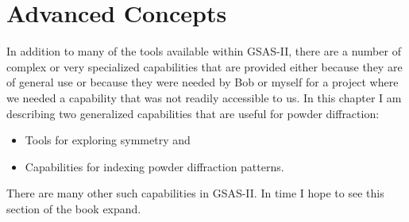 \chapter{Advanced Concepts}

In addition to many of the tools available within GSAS-II, there are a number of complex or very specialized capabilities that are provided either because they are of general use or because they were needed by Bob or myself for a project where we needed a capability that was not readily accessible to us. In this chapter I am describing two generalized capabilities that are useful for powder diffraction:
\begin{itemize}
    \item Tools for exploring symmetry and 
    \item Capabilities for indexing powder diffraction patterns.
\end{itemize} 
There are many other such capabilities in GSAS-II. In time I hope to see this section of the book expand. 